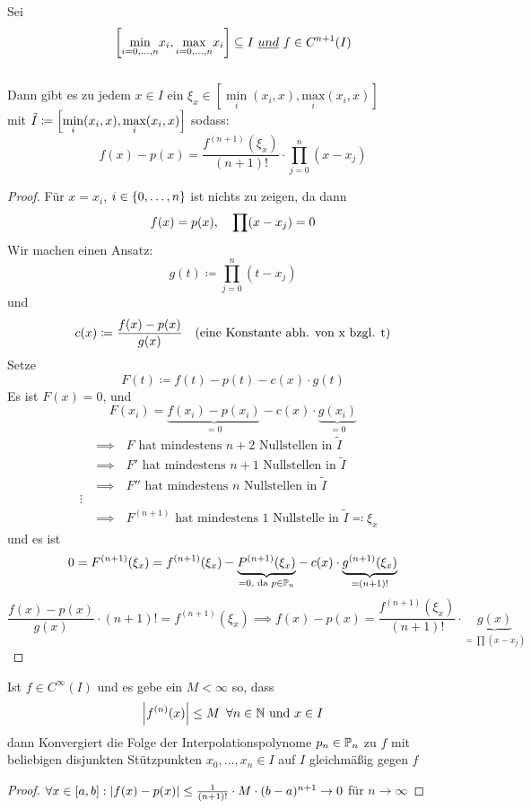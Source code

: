 \begin{theorem}
    Sei \[
    \left[\underset{i=0,\dots,n}{\min}x_i,\underset{i=0,\dots,n}{\text{max}}x_i\right] \subseteq I \ \emph{und}\ f\in 
    C^{n+1}(I)
    \]\\
    Dann gibt es zu jedem $x\in I $ ein $ \xi_x\in \left[\underset{i}{\min}(x_i,x),\underset{i}{\text{max}}(x_i,x)\right] $
   \\ mit $\Tilde{I}\coloneqq \left[\underset{i}{\min}(x_i,x),\underset{i}{\text{max}}(x_i,x)\right] $ sodass:\\
    \[
f(x)-p(x)=\frac{f^{(n+1)}(\xi_x)}{(n+1)!}\cdot\prod^n_{j=0}(x-x_j)
    \]
\end{theorem}
\begin{proof}
    Für $x=x_i$, $i\in \left\{ 0,\dots,n \right\}$ ist nichts zu zeigen, da dann \[
        f(x) = p(x), \hspace{1em} \prod(x-x_j) = 0\]
    Wir machen einen Ansatz:\[
        g(t)\coloneqq \prod_{j=0}^n(t-x_j)\]
    und \[
        c(x) \coloneqq \frac{f(x) - p(x)}{g(x)}\hspace{1em}\text{(eine Konstante abh. von x bzgl. t)}\]
    Setze \[
        F(t) \coloneqq f(t) - p(t) - c(x) \cdot g(t)\]
    Es ist $F(x) = 0$, und \[
        F(x_i) = \underset{=0}{\underbrace{f(x_i) - p(x_i)}} - c(x) \cdot 
        \underset{=0}{\underbrace{g(x_i)}}\]
    \begin{align*}
        &\implies \text{ $F$ hat mindestens $n+2$ Nullstellen in $\tilde{I}$}\\
        &\implies \text{ $F'$ hat mindestens $n+1$ Nullstellen in $\tilde{I}$}\\
        &\implies \text{ $F''$ hat mindestens $n$ Nullstellen in $\tilde{I}$}\\
        \vdots\\
    &\implies \text{ $F^{(n+1)}$ hat mindestens $1$ Nullstelle in $\tilde{I}\eqqcolon \xi_x$ }
    \end{align*}
    und es ist \[
        0 = F^{(n+1)}(\xi_x) = f^{(n+1)}(\xi_x) - \underset{=0, \text{ da } p\in\mathbb{P}_n}{\underbrace{P^{(n+1)}(\xi_x)}} - 
        c(x) \cdot \underset{=(n+1)!}{\underbrace{g^{(n+1)}(\xi_x)}}\]
    \[
        \frac{f(x) - p(x)}{g(x)} \cdot (n+1)! = f^{(n+1)}(\xi_x) \implies f(x)-p(x) = \frac{f^{(n+1)}(\xi_x)}{(n+1)!}\cdot 
        \underset{=\prod(x-x_j)}{\underbrace{g(x)}}\]
\end{proof}



\begin{corollary}
    Ist $f \in C^\infty(I)$ und es gebe ein $M<\infty$ so, dass \[
    \left\vert f^{(n)}(x) \right\vert \leq M\hspace{.5em} \forall n \in \mathbb{N} \text{ und }x\in I 
    \]
    dann Konvergiert die Folge der Interpolationspolynome $p_n\in\mathbb{P}_n$ zu $f$ mit beliebigen disjunkten Stützpunkten
    $x_0,\dots,x_n \in I$ auf $I$ gleichmäßig gegen $f$
\end{corollary}
\begin{proof}
    $\forall x\in [a,b]: \left\vert f(x)-p(x) \right\vert \leq \frac{1}{(n+1)!}\cdot M \cdot (b-a)^{n+1}\to 0$ für $n\to \infty$
\end{proof}


